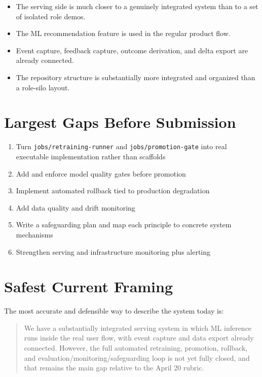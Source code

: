 \documentclass[11pt,a4paper]{article}
\begin{document}
\begin{itemize}
  \item The serving side is much closer to a genuinely integrated system than to a set of isolated role demos.
  \item The ML recommendation feature is used in the regular product flow.
  \item Event capture, feedback capture, outcome derivation, and delta export are already connected.
  \item The repository structure is substantially more integrated and organized than a role-silo layout.
\end{itemize}

\section{Largest Gaps Before Submission}

\begin{enumerate}[leftmargin=1.5em]
  \item Turn \texttt{jobs/retraining-runner} and \texttt{jobs/promotion-gate} into real executable implementation rather than scaffolds
  \item Add and enforce model quality gates before promotion
  \item Implement automated rollback tied to production degradation
  \item Add data quality and drift monitoring
  \item Write a safeguarding plan and map each principle to concrete system mechanisms
  \item Strengthen serving and infrastructure monitoring plus alerting
\end{enumerate}

\section{Safest Current Framing}

The most accurate and defensible way to describe the system today is:

\begin{quote}
We have a substantially integrated serving system in which ML inference runs inside the real user flow, with event capture and data export already connected. However, the full automated retraining, promotion, rollback, and evaluation/monitoring/safeguarding loop is not yet fully closed, and that remains the main gap relative to the April 20 rubric.
\end{quote}
\end{document}
